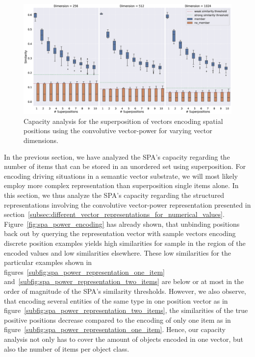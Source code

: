 \begin{figure}[t]
    \centering
    \includegraphics[width=0.95\linewidth]{imgs/spa_power_capacity.eps}
    \caption{Capacity analysis for the superposition of vectors encoding spatial positions using the convolutive vector-power for varying vector dimensions.}
    \label{fig:spa_power_capacity}
\end{figure}

In the previous section, we have analyzed the \ac{SPA}'s capacity regarding the number of items that can be stored in an unordered set using superposition.
For encoding driving situations in a semantic vector substrate, we will most likely employ more complex representation than superposition single items alone.
In this section, we thus analyze the \ac{SPA}'s capacity regarding the structured representations involving the convolutive vector-power representation presented in section~\ref{subsec:different_vector_representations_for_numerical_values}.
Figure~\ref{fig:spa_power_encoding} has already shown, that unbinding positions back out by querying the representation vector with sample vectors encoding discrete position examples yields high similarities for sample in the region of the encoded values and low similarities elsewhere.
These low similarities for the particular examples shown in figures~\ref{subfig:spa_power_representation_one_item} and~\ref{subfig:spa_power_representation_two_items} are below or at most in the order of magnitude of the \ac{SPA}'s similarity thresholds.
However, we also observe, that encoding several entities of the same type in one position vector as in figure~\ref{subfig:spa_power_representation_two_items}, the similarities of the true positive positions decrease compared to the encoding of only one item as in figure~\ref{subfig:spa_power_representation_one_item}.
Hence, our capacity analysis not only has to cover the amount of objects encoded in one vector, but also the number of items per object class.

